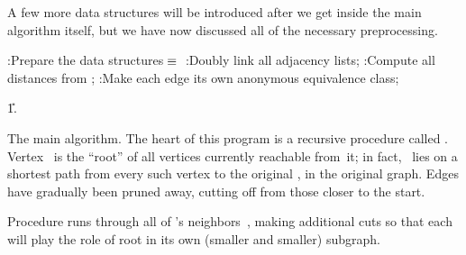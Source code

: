 A few more data structures will be introduced after we get
inside the main algorithm itself, but we have now discussed all
of the necessary preprocessing.

\Y\B\4:Prepare the data structures\X${}\equiv{}$\6
:Doubly link all adjacency lists\X;\6
:Compute all distances from \X;\6
:Make each edge its own anonymous equivalence class\X;\par
\U1.\fi

The main algorithm. The heart of this program is a recursive procedure
called . Vertex~ is the ``root'' of all
vertices currently reachable from~it; in fact,
~lies on a shortest path from every such vertex
to the original , in the original graph. Edges have
gradually
been pruned away, cutting  off from those closer to the start.

Procedure  runs through all of 's neighbors~,
making additional cuts so that each  will play the role of root
in its own (smaller and smaller) subgraph.

